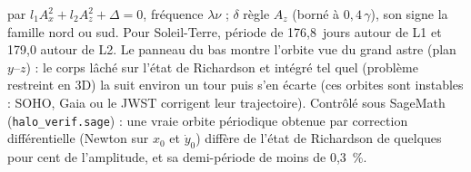 \begin{itemize}
par $l_1A_x^2+l_2A_z^2+\Delta=0$, fréquence $\lambda\nu$ ; $\delta$ règle $A_z$ (borné à $0{,}4\,\gamma$), son signe la
famille nord ou sud. Pour Soleil-Terre, période de 176,8~jours autour de L1 et 179,0 autour de L2. Le panneau du bas
montre l'orbite vue du grand astre (plan $y$--$z$) : le corps lâché sur l'état de Richardson et intégré tel quel
(problème restreint en 3D) la suit environ un tour puis s'en écarte (ces orbites sont instables : SOHO, Gaia ou le
JWST corrigent leur trajectoire). Contrôlé sous SageMath (\texttt{halo\_verif.sage}) : une vraie orbite périodique
obtenue par correction différentielle (Newton sur $x_0$ et $\dot y_0$) diffère de l'état de Richardson de quelques
pour cent de l'amplitude, et sa demi-période de moins de 0,3~\%.
\end{itemize}

